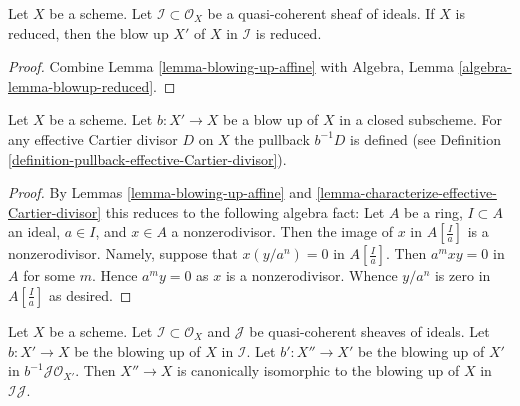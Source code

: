 \begin{lemma}
\label{lemma-blow-up-reduced-scheme}
Let $X$ be a scheme. Let $\mathcal{I} \subset \mathcal{O}_X$ be a
quasi-coherent sheaf of ideals. If $X$ is reduced, then the
blow up $X'$ of $X$ in $\mathcal{I}$ is reduced.
\end{lemma}

\begin{proof}
Combine Lemma \ref{lemma-blowing-up-affine}
with Algebra, Lemma \ref{algebra-lemma-blowup-reduced}.
\end{proof}

\begin{lemma}
\label{lemma-blow-up-pullback-effective-Cartier}
Let $X$ be a scheme. Let $b : X' \to X$ be a blow up of $X$ in a closed
subscheme. For any effective Cartier divisor $D$ on $X$ the pullback
$b^{-1}D$ is defined (see Definition
\ref{definition-pullback-effective-Cartier-divisor}).
\end{lemma}

\begin{proof}
By Lemmas \ref{lemma-blowing-up-affine} and
\ref{lemma-characterize-effective-Cartier-divisor}
this reduces to the following algebra fact:
Let $A$ be a ring, $I \subset A$ an ideal, $a \in I$, and $x \in A$
a nonzerodivisor. Then the image of $x$ in $A[\frac{I}{a}]$ is a
nonzerodivisor. Namely, suppose that $x (y/a^n) = 0$ in $A[\frac{I}{a}]$.
Then $a^mxy = 0$ in $A$ for some $m$. Hence $a^my = 0$ as $x$ is a
nonzerodivisor. Whence $y/a^n$ is zero in $A[\frac{I}{a}]$ as desired.
\end{proof}

\begin{lemma}
\label{lemma-blowing-up-two-ideals}
Let $X$ be a scheme. Let $\mathcal{I} \subset \mathcal{O}_X$ and
$\mathcal{J}$ be quasi-coherent sheaves of ideals. Let $b : X' \to X$
be the blowing up of $X$ in $\mathcal{I}$. Let $b' : X'' \to X'$ be the
blowing up of $X'$ in $b^{-1}\mathcal{J} \mathcal{O}_{X'}$. Then $X'' \to X$
is canonically isomorphic to the blowing up of $X$ in $\mathcal{I}\mathcal{J}$.
\end{lemma}

